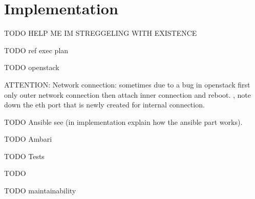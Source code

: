 \chapter{Implementation}
\label{chap:impl}

TODO HELP ME IM STREGGELING WITH EXISTENCE

TODO ref exec plan

TODO openstack

    ATTENTION: Network connection: sometimes due to a bug in openstack first only outer network connection then attach inner connection and reboot. 
    , note down the eth port that is newly created for internal connection.

TODO Ansible
see 
     (in implementation explain how the ansible part works). 

TODO Ambari

TODO Tests




TODO

TODO maintainability
